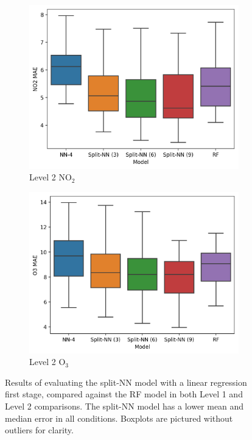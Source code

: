 \documentclass[journal abbreviation, manuscript]{copernicus}
\newcommand{\textus}[1]{$_{\text{#1}}$}
\begin{document}
\begin{figure}[H]
\begin{subfigure}{0.45\textwidth}
\includegraphics[width=\textwidth]{results/split-no2-location-level2-mae}
\caption{Level 2 NO\textus{2}}
\end{subfigure}
\begin{subfigure}{0.45\textwidth}
\includegraphics[width=\textwidth]{results/split-o3-location-level2-mae}
\caption{Level 2 O\textus{3}}
\end{subfigure}
\caption{Results of evaluating the split-NN model with a linear regression first stage, compared against the RF model in both Level 1 and Level 2 comparisons. The split-NN model has a lower mean and median error in all conditions. Boxplots are pictured without outliers for clarity.}
\label{fig:split-results-lrfe}
\end{figure}
\end{document}

